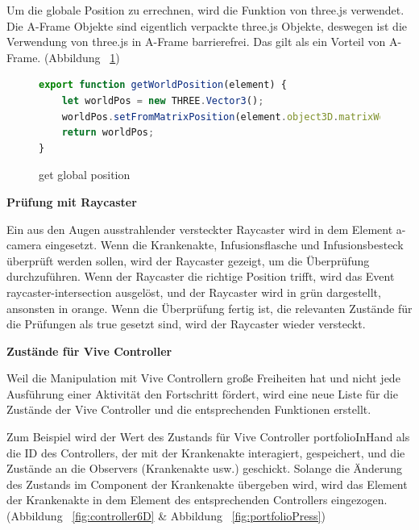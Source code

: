   Um die globale Position zu errechnen, wird die Funktion von three.js verwendet. Die A-Frame Objekte sind eigentlich verpackte three.js Objekte, deswegen ist die Verwendung von three.js in A-Frame barrierefrei. Das gilt als ein Vorteil von A-Frame. (Abbildung ~\ref{fig:getWorldPosition})
  
\begin{figure}[ht]
\vspace*{1em}
\centering
\caption[get global position]{get global position}
\begin{lstlisting}[language=JavaScript, style=htmlcssjs]
export function getWorldPosition(element) {
    let worldPos = new THREE.Vector3();
    worldPos.setFromMatrixPosition(element.object3D.matrixWorld);
    return worldPos;
}
\end{lstlisting}
\label{fig:getWorldPosition} 
\end{figure}
  
  \vspace{1em}
  \noindent
  \textbf{Prüfung mit Raycaster}
  \vspace{1em}
  
  \noindent
  Ein aus den Augen ausstrahlender versteckter Raycaster wird in dem Element {\selectfont a-camera} eingesetzt. Wenn die Krankenakte, Infusionsflasche und Infusionsbesteck überprüft werden sollen, wird der Raycaster gezeigt, um die Überprüfung durchzuführen. Wenn der Raycaster die richtige Position trifft, wird das Event {\selectfont raycaster-intersection} ausgelöst, und der Raycaster wird in grün dargestellt, ansonsten in orange. Wenn die Überprüfung fertig ist, die relevanten Zustände für die Prüfungen als {\selectfont true} gesetzt sind, wird der Raycaster wieder versteckt.
  
  \vspace{1em}
  \noindent
  \textbf{Zustände für Vive Controller}
  \vspace{1em}
  
  \noindent
  Weil die Manipulation mit Vive Controllern große Freiheiten hat und nicht jede Ausführung einer Aktivität den Fortschritt fördert, wird eine neue Liste für die Zustände der Vive Controller und die entsprechenden Funktionen erstellt.
  
  Zum Beispiel wird der Wert des Zustands für Vive Controller {\selectfont portfolioInHand} als die ID des Controllers, der mit der Krankenakte interagiert, gespeichert, und die Zustände an die Observers (Krankenakte usw.) geschickt. Solange die Änderung des Zustands im Component der Krankenakte übergeben wird, wird das Element der Krankenakte in dem Element des entsprechenden Controllers eingezogen. (Abbildung ~\ref{fig:controller6D} \& Abbildung ~\ref{fig:portfolioPress})
  
